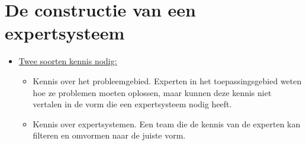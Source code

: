 \section{De constructie van een expertsysteem}
\begin{itemize}
	\item \underline{Twee soorten kennis nodig:}
	\begin{itemize}
		\item Kennis over het probleemgebied. Experten in het toepassingsgebied weten hoe ze problemen moeten oplossen, maar kunnen deze kennis niet vertalen in de vorm die een expertsysteem nodig heeft.
		\item Kennis over expertsystemen. Een team die de kennis van de experten kan filteren en omvormen naar de juiste vorm. 
	\end{itemize}
\end{itemize}
